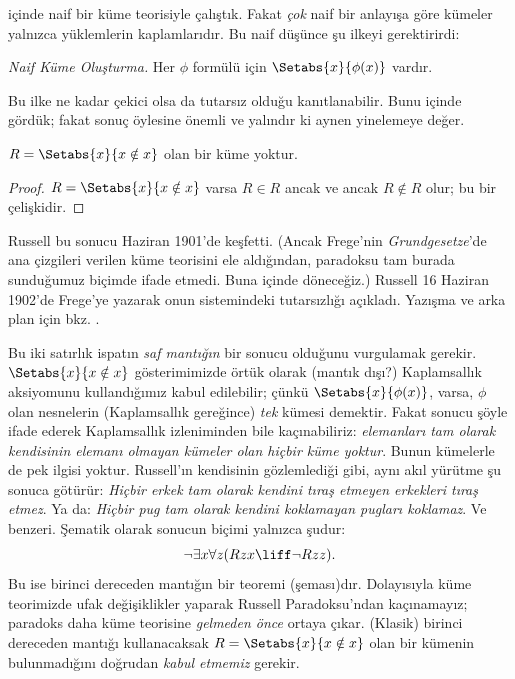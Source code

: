 


 içinde naif bir küme teorisiyle çalıştık. Fakat
\emph{çok} naif bir anlayışa göre kümeler yalnızca yüklemlerin kaplamlarıdır.
Bu naif düşünce şu ilkeyi gerektirirdi:

\begin{defish}
  \emph{Naif Küme Oluşturma.} Her $\phi$ formülü için
  $\Setabs{x}{\phi(x)}$ vardır.
\end{defish}

Bu ilke ne kadar çekici olsa da tutarsız olduğu kanıtlanabilir. Bunu
 içinde gördük; fakat sonuç öylesine önemli ve
yalındır ki aynen yinelemeye değer.

\begin{thm}
$R=\Setabs{x}{x\notin x}$ olan bir küme yoktur.
\end{thm}

\begin{proof}
$R=\Setabs{x}{x\notin x}$ varsa $R\in R$ ancak ve ancak $R\notin R$ olur;
bu bir çelişkidir.
\end{proof}

Russell bu sonucu Haziran 1901'de keşfetti. (Ancak Frege'nin
\emph{Grundgesetze}'de ana çizgileri verilen küme teorisini ele aldığından,
paradoksu tam burada sunduğumuz biçimde ifade etmedi. Buna
 içinde döneceğiz.) Russell 16 Haziran 1902'de Frege'ye
yazarak onun sistemindeki tutarsızlığı açıkladı. Yazışma ve arka plan için
bkz. \citet[pp.~124--8]{Heijenoort1967}.

Bu iki satırlık ispatın \emph{saf mantığın} bir sonucu olduğunu vurgulamak
gerekir. $\Setabs{x}{x\notin x}$ gösterimimizde örtük olarak (mantık dışı?)
Kaplamsallık aksiyomunu kullandığımız kabul edilebilir; çünkü
$\Setabs{x}{\phi(x)}$, varsa, $\phi$ olan nesnelerin (Kaplamsallık gereğince)
\emph{tek} kümesi demektir. Fakat sonucu şöyle ifade ederek Kaplamsallık
izleniminden bile kaçınabiliriz: \emph{elemanları tam olarak kendisinin
elemanı olmayan kümeler olan hiçbir küme yoktur}. Bunun kümelerle de pek
ilgisi yoktur. Russell'ın kendisinin gözlemlediği gibi, aynı akıl yürütme şu
sonuca götürür: \emph{Hiçbir erkek tam olarak kendini tıraş etmeyen erkekleri
tıraş etmez}. Ya da: \emph{Hiçbir pug tam olarak kendini koklamayan pugları
koklamaz}. Ve benzeri. Şematik olarak sonucun biçimi yalnızca şudur:
\[
\lnot \exists x \forall z(Rzx \liff \lnot R zz).
\]
Bu ise birinci dereceden mantığın bir teoremi (şeması)dır. Dolayısıyla küme
teorimizde ufak değişiklikler yaparak Russell Paradoksu'ndan kaçınamayız;
paradoks daha küme teorisine \emph{gelmeden önce} ortaya çıkar. (Klasik)
birinci dereceden mantığı kullanacaksak $R=\Setabs{x}{x\notin x}$ olan bir
kümenin bulunmadığını doğrudan \emph{kabul etmemiz} gerekir.

